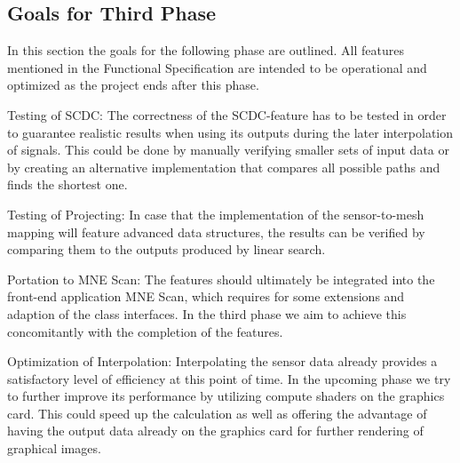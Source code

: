 \subsection{Goals for Third Phase}
In this section the goals for the following phase are outlined. All features mentioned in the Functional Specification are intended to be operational and optimized as the project ends after this phase.


\begin{aims}
	\item[\hspace*{11mm} Testing of SCDC:] The correctness of the SCDC-feature has to be tested in order to guarantee realistic results when using its outputs during the later interpolation of signals. This could be done by manually verifying smaller sets of input data or by creating an alternative implementation that compares all possible paths and finds the shortest one.
\end{aims}

\begin{aims}
\item[\hspace*{11mm} Testing of Projecting:] In case that the implementation of the sensor-to-mesh mapping will feature advanced data structures, the results can be verified by comparing them to the outputs produced by linear search.
\end{aims}


\begin{aims}
\item[\hspace*{11mm} Portation to MNE Scan:] 
The features should ultimately be integrated into the front-end application MNE Scan, which requires for some extensions and adaption of the class interfaces. In the third phase we aim to achieve this concomitantly with the completion of the features.
\end{aims}

\begin{aims}
	\item[\hspace*{11mm} Optimization of Interpolation:] 
	Interpolating the sensor data already provides a satisfactory level of efficiency at this point of time. In the upcoming phase we try to further improve its performance by utilizing compute shaders on the graphics card. This could speed up the calculation as well as offering the advantage of having the output data already on the graphics card for further rendering of graphical images.
\end{aims}

